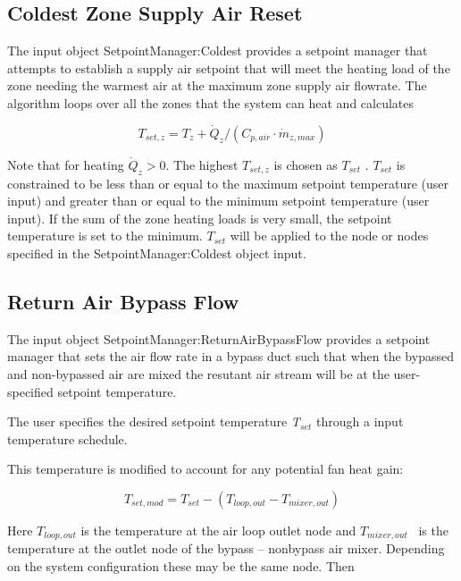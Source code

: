 \subsection{Coldest Zone Supply Air Reset}\label{coldest-zone-supply-air-reset}

The input object SetpointManager:Coldest provides a setpoint manager that attempts to establish a supply air setpoint that will meet the heating load of the zone needing the warmest air at the maximum zone supply air flowrate. The algorithm loops over all the zones that the system can heat and calculates

\begin{equation}
{T_{set,z}} = {T_z} + {\dot Q_z}/({C_{p,air}}\cdot {\dot m_{z,max}})
\end{equation}

Note that for heating \({\dot Q_z} > 0.\) The highest \({T_{set,z}}\) is chosen as \({T_{set}}\) . \({T_{set}}\) is constrained to be less than or equal to the maximum setpoint temperature (user input) and greater than or equal to the minimum setpoint temperature (user input). If the sum of the zone heating loads is very small, the setpoint temperature is set to the minimum. \({T_{set}}\) will be applied to the node or nodes specified in the SetpointManager:Coldest object input.

\subsection{Return Air Bypass Flow}\label{return-air-bypass-flow}

The input object SetpointManager:ReturnAirBypassFlow provides a setpoint manager that sets the air flow rate in a bypass duct such that when the bypassed and non-bypassed air are mixed the resutant air stream will be at the user-specified setpoint temperature.

The user specifies the desired setpoint temperature \emph{T\(_{set}\)} through a input temperature schedule.

This temperature is modified to account for any potential fan heat gain:

\begin{equation}
{T_{set,mod}} = {T_{set}} - ({T_{loop,out}} - {T_{mixer,out}})
\end{equation}

Here \({T_{loop,out}}\) is the temperature at the air loop outlet node and \({T_{mixer,out}}\) ~is the temperature at the outlet node of the bypass -- nonbypass air mixer. Depending on the system configuration these may be the same node. Then

